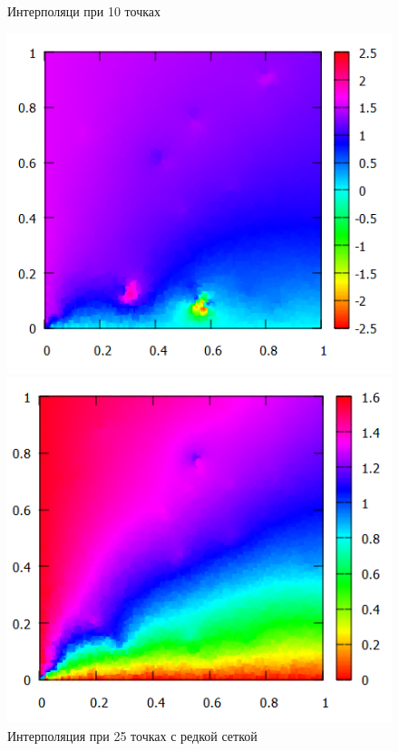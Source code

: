 \documentclass[14pt, a4paper]{extarticle}
\begin{document}
\begin{enumerate}
\begin{figure}[H]
\begin{minipage}{0.5\textwidth}
					\caption[.] {Интерполяци при 10 точках}
				\end{minipage}\hfill
			\end{figure}
			\begin{figure}[H]
				\begin{minipage}{0.5\textwidth}
					\centering
					\includegraphics[width = \linewidth]{../3func/M=25T=3714Err=0.123237.png}
					\caption[.] {Интерполяция при 25 точках с редкой сеткой}
				\end{minipage}\hfill
				\begin{minipage}{0.5\textwidth}
					\centering
					\includegraphics[width = \linewidth]{../3func/M=25T=5774Err=0.0666124.png}

\end{minipage}
\end{figure}
\end{enumerate}
\end{document}
